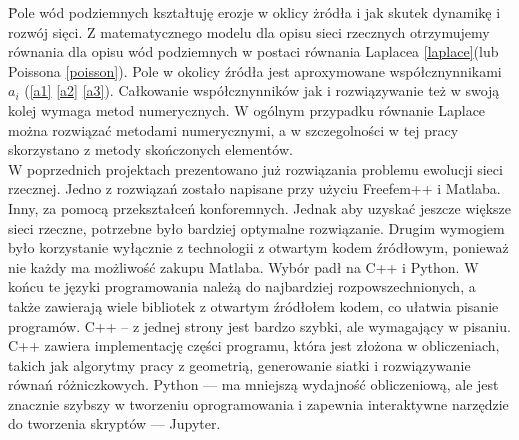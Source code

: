 \documentclass[]{pracamgr}
\begin{document}
    \hspace{1em} \= 
    Pole wód podziemnych kształtuję erozje w oklicy żródła i jak skutek dynamikę i rozwój sięci. Z matematycznego modelu dla opisu sieci rzecznych otrzymujemy równania dla opisu wód podziemnych w postaci równania Laplacea \ref{laplace}(lub Poissona \ref{poisson}). Pole w okolicy źródła jest aproxymowane współcznynnikami $a_i$ (\ref{a1} \ref{a2} \ref{a3}). Całkowanie współcznynników jak i rozwiązywanie też w swoją kolej wymaga metod numerycznych. W ogólnym przypadku równanie Laplace można rozwiązać metodami numerycznymi, a w szczegolności w tej pracy skorzystano z metody skończonych elementów. \\ \indent
    W poprzednich projektach prezentowano już rozwiązania problemu ewolucji sieci rzecznej. Jedno z rozwiązań zostało napisane przy użyciu Freefem++ i Matlaba. Inny, za pomocą przekształceń konforemnych. Jednak aby uzyskać jeszcze większe sieci rzeczne, potrzebne było bardziej optymalne rozwiązanie. Drugim wymogiem było korzystanie wyłącznie z technologii z otwartym kodem źródłowym, ponieważ nie każdy ma możliwość zakupu Matlaba. Wybór padł na C++\cite{Stroustrup1997} i Python\cite{python3}. W końcu te języki programowania należą do najbardziej rozpowszechnionych, a także zawierają wiele bibliotek z otwartym źródłołem kodem, co ułatwia pisanie programów. C++ -- z jednej strony jest bardzo szybki, ale wymagający w pisaniu. C++ zawiera implementację części programu, która jest złożona w obliczeniach, takich jak algorytmy pracy z geometrią, generowanie siatki i rozwiązywanie równań różniczkowych. Python — ma mniejszą wydajność obliczeniową, ale jest znacznie szybszy w tworzeniu oprogramowania i zapewnia interaktywne narzędzie do tworzenia skryptów — Jupyter.
\end{document}
